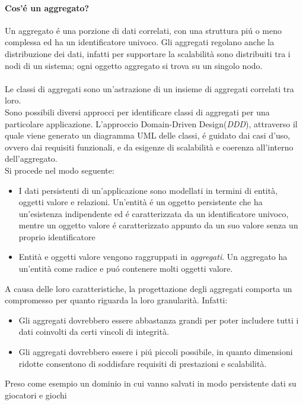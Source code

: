 \paragraph{Cos'é un aggregato?}
Un aggregato é una porzione di dati correlati, con una struttura piú o meno complessa ed ha un identificatore univoco.
Gli aggregati regolano anche la distribuzione dei dati, infatti per supportare la scalabilità sono distribuiti tra i nodi
di un sistema;
ogni oggetto aggregato si trova su un singolo nodo.\\
\\
Le classi di aggregati sono un'astrazione di un insieme di aggregati correlati tra loro.\\
Sono possibili diversi approcci per identificare classi di aggregati per una particolare applicazione.
L'approccio Domain-Driven Design(\emph{DDD}), attraverso il quale viene generato un diagramma UML delle classi,
é guidato dai casi d'uso, ovvero dai requisiti funzionali, e da esigenze di scalabilità e coerenza all'interno dell'aggregato.\\
Si procede nel modo seguente:
\begin{itemize}
    \item I dati persistenti di un'applicazione sono modellati in termini di entità, oggetti valore e
    relazioni.
    Un'entità é un oggetto persistente che ha un'esistenza indipendente ed é caratterizzata da un identificatore
    univoco, mentre un oggetto valore é caratterizzato appunto da un suo valore senza un proprio identificatore
    \item Entità e oggetti valore vengono raggruppati in \emph{aggregati}.
    Un aggregato ha un'entità come radice e puó contenere molti oggetti valore.
\end{itemize}
A causa delle loro caratteristiche, la progettazione degli aggregati comporta un compromesso per quanto riguarda
la loro granularità.
Infatti:
\begin{itemize}
    \item Gli aggregati dovrebbero essere abbastanza grandi per poter includere tutti i dati coinvolti da
    certi vincoli di integrità.
    \item Gli aggregati dovrebbero essere i piú piccoli possibile, in quanto dimensioni ridotte consentono di
    soddisfare requisiti di prestazioni e scalabilità.
\end{itemize}
Preso come esempio un dominio in cui vanno salvati in modo persistente dati su giocatori e giochi
